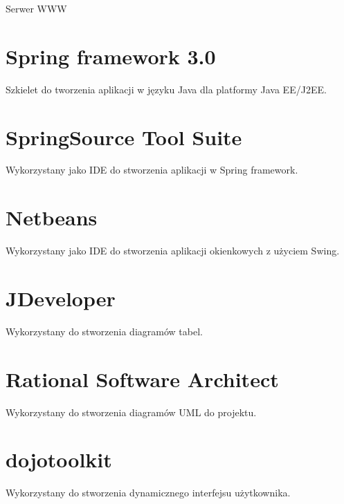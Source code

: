 \documentclass[a4paper, oneside, 11pt]{report}
\begin{document}
Serwer WWW

\section{Spring framework 3.0}

Szkielet do tworzenia aplikacji w języku Java dla platformy Java EE/J2EE.

\section{SpringSource Tool Suite}

Wykorzystany jako IDE do stworzenia aplikacji w Spring framework.

\section{Netbeans}

Wykorzystany jako IDE do stworzenia aplikacji okienkowych z użyciem Swing.

\section{JDeveloper}

Wykorzystany do stworzenia diagramów tabel.

\section{Rational Software Architect}

Wykorzystany do stworzenia diagramów UML do projektu.

\section{dojotoolkit}

Wykorzystany do stworzenia dynamicznego interfejsu użytkownika.


\end{document}
